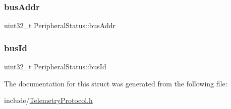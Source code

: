 \subsubsection{\texorpdfstring{bus\+Addr}{busAddr}}
{\footnotesize\ttfamily uint32\+\_\+t Peripheral\+Status\+::bus\+Addr}

\mbox{\label{struct_peripheral_status_ad1d03bec7b4820fa7089ea59a61aa228}} 
\subsubsection{\texorpdfstring{bus\+Id}{busId}}
{\footnotesize\ttfamily uint32\+\_\+t Peripheral\+Status\+::bus\+Id}



The documentation for this struct was generated from the following file\+:\begin{DoxyCompactItemize}
\item 
include/\mbox{\hyperlink{_telemetry_protocol_8h}{Telemetry\+Protocol.\+h}}\end{DoxyCompactItemize}
